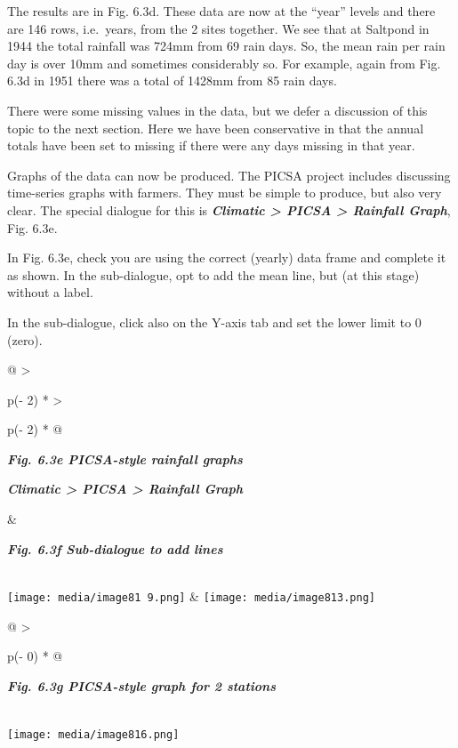 \documentclass[
  letterpaper,
  DIV=11,
  numbers=noendperiod]{scrreprt}
\begin{document}
The results are in Fig. 6.3d. These data are now at the ``year'' levels
and there are 146 rows, i.e.~years, from the 2 sites together. We see
that at Saltpond in 1944 the total rainfall was 724mm from 69 rain days.
So, the mean rain per rain day is over 10mm and sometimes considerably
so. For example, again from Fig. 6.3d in 1951 there was a total of
1428mm from 85 rain days.

There were some missing values in the data, but we defer a discussion of
this topic to the next section. Here we have been conservative in that
the annual totals have been set to missing if there were any days
missing in that year.

Graphs of the data can now be produced. The PICSA project includes
discussing time-series graphs with farmers. They must be simple to
produce, but also very clear. The special dialogue for this is
\textbf{\emph{Climatic \textgreater{} PICSA \textgreater{} Rainfall
Graph}}, Fig. 6.3e.

In Fig. 6.3e, check you are using the correct (yearly) data frame and
complete it as shown. In the sub-dialogue, opt to add the mean line, but
(at this stage) without a label.

In the sub-dialogue, click also on the Y-axis tab and set the lower
limit to 0 (zero).

\begin{longtable}[]{@{}
  >{\raggedright\arraybackslash}p{(\columnwidth - 2\tabcolsep) * }
  >{\raggedright\arraybackslash}p{(\columnwidth - 2\tabcolsep) * }@{}}
\toprule\noalign{}
\begin{minipage}[b]{\linewidth}\raggedright
\textbf{\emph{Fig. 6.3e PICSA-style rainfall graphs}}

\textbf{\emph{Climatic \textgreater{} PICSA \textgreater{} Rainfall
Graph}}
\end{minipage} & \begin{minipage}[b]{\linewidth}\raggedright
\textbf{\emph{Fig. 6.3f Sub-dialogue to add lines}}
\end{minipage} \\
\midrule\noalign{}
\endhead
\bottomrule\noalign{}
\endlastfoot
\texttt{[image: media/image81 9.png]}
&
\texttt{[image: media/image813.png]} \\
\end{longtable}

\begin{longtable}[]{@{}
  >{\raggedright\arraybackslash}p{(\columnwidth - 0\tabcolsep) * }@{}}
\toprule\noalign{}
\begin{minipage}[b]{\linewidth}\raggedright
\textbf{\emph{Fig. 6.3g PICSA-style graph for 2 stations}}
\end{minipage} \\
\midrule\noalign{}
\endhead
\bottomrule\noalign{}
\endlastfoot
\texttt{[image: media/image816.png]} \\
\end{longtable}
\end{document}
